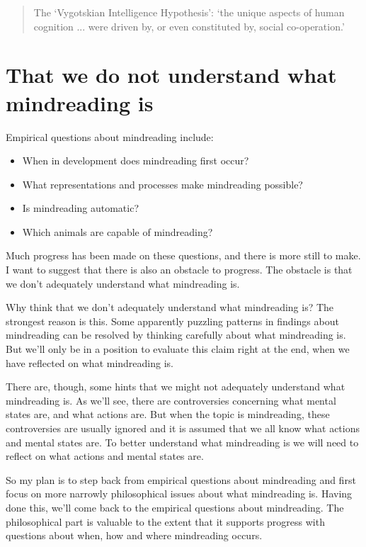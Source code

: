 \documentclass[12pt,\papersize]{extarticle}
\begin{document}
\begin{quote}
The `Vygotskian Intelligence Hypothesis': `the unique aspects of human cognition ... were driven by, or even constituted by, social co-operation.'\citep[p.\ 1]{Moll:2007gu}
\end{quote}


\section{That we do not understand what mindreading is}
Empirical questions about mindreading include:
\begin{itemize}
\item When in development does mindreading first occur?
\item What representations and processes make mindreading possible?
\item Is mindreading automatic?
\item Which animals are capable of mindreading?
\end{itemize}
%
Much progress has been made on these questions, and there is more still to make. 
I want to suggest that there is also an obstacle to progress.
The obstacle is that we don't adequately understand what mindreading is. 

Why think that we don't adequately understand what mindreading is? 
The strongest reason is this.
Some apparently puzzling patterns in findings about mindreading can be resolved by thinking carefully about what mindreading is. 
But we'll only be in a position to evaluate this claim right at the end, when we have reflected on what mindreading is.

There are, though, some hints that we might not adequately understand what mindreading is.
As we'll see, there are controversies concerning what mental states are, and what actions are.  
But when the topic is mindreading, these controversies are usually ignored and it is assumed that we all know what actions and mental states are. 
To better understand what mindreading is we will need to reflect on what actions and mental states are.

So my plan is to step back from empirical questions about mindreading and first focus on more narrowly philosophical issues about what mindreading is.
Having done this, we'll come back to the empirical questions about mindreading.  
The philosophical part is valuable to the extent that it supports progress with questions about when, how and where mindreading occurs.
\end{document}
